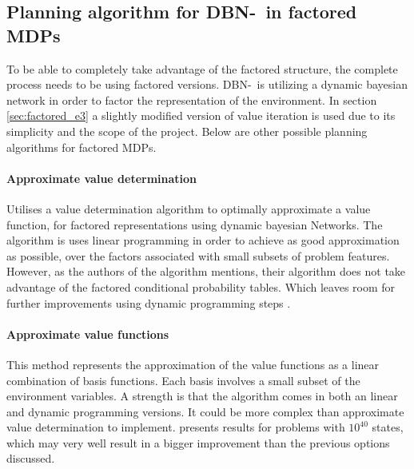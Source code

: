 \subsection{Planning algorithm for DBN-\etre\ in factored MDPs}
\label{sec:better_planing_algos}

To be able to completely take advantage of the factored structure, the complete
process needs to be using factored versions. DBN-\etre\ is utilizing a dynamic
bayesian network in order to factor the representation of the environment. In
section \ref{sec:factored_e3} a slightly modified version of value iteration is
used due to its simplicity and the scope of the project. Below are other
possible planning algorithms for factored MDPs.

\paragraph{Approximate value determination}

Utilises a value determination algorithm to optimally approximate a value
function, for factored representations using dynamic bayesian Networks. The
algorithm is uses linear programming in order to achieve as good approximation
as possible, over the factors associated with small subsets of problem
features. However, as the authors of the algorithm mentions, their algorithm
does not take advantage of the factored conditional probability tables. Which
leaves room for further improvements using dynamic programming steps
\parencite{koller1999computing}.

\paragraph{Approximate value functions}

This method represents the approximation of the value functions as a linear
combination of basis functions. Each basis involves a small subset of the
environment variables. A strength is that the algorithm comes in both an linear
and dynamic programming versions. It could be more complex than approximate
value determination to implement. \textcite{guestrin2003efficient} presents
results for problems with $10^{40}$ states, which may very well result in a
bigger improvement than the previous options discussed.
